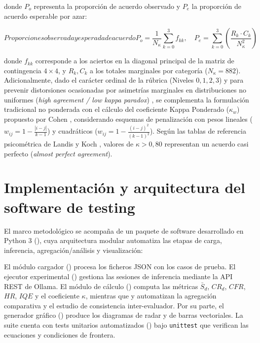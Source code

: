 donde $P_o$ representa la proporción de acuerdo observado y $P_e$ la proporción de acuerdo esperable por azar:

\begin{equation}[EQ:PROPORCIONESKAPPA]{Proporciones observada y esperada de acuerdo}
    P_o = \frac{1}{N_\kappa} \sum_{k=0}^{3} f_{kk}, \quad P_e = \sum_{k=0}^{3} \left( \frac{R_k \cdot C_k}{N_\kappa^2} \right)
\end{equation}

donde $f_{kk}$ corresponde a los aciertos en la diagonal principal de la matriz de contingencia $4 \times 4$, y $R_k, C_k$ a los totales marginales por categoría ($N_\kappa = 882$). Adicionalmente, dado el carácter ordinal de la rúbrica (Niveles $0, 1, 2, 3$) y para prevenir distorsiones ocasionadas por asimetrías marginales en distribuciones no uniformes (\textit{high agreement / low kappa paradox}) \cite{feinstein1990high}, se complementa la formulación tradicional no ponderada con el cálculo del coeficiente Kappa Ponderado ($\kappa_w$) propuesto por Cohen \cite{cohen1968weighted}, considerando esquemas de penalización con pesos lineales ($w_{ij} = 1 - \frac{|i-j|}{k-1}$) y cuadráticos ($w_{ij} = 1 - \frac{(i-j)^2}{(k-1)^2}$). Según las tablas de referencia psicométrica de Landis y Koch \cite{landis1977measurement}, valores de $\kappa > 0{,}80$ representan un acuerdo casi perfecto (\textit{almost perfect agreement}).

\section{Implementación y arquitectura del software de testing}
\label{sec:arquitectura_software}
El marco metodológico se acompaña de un paquete de software desarrollado en Python 3 (), cuya arquitectura modular automatiza las etapas de carga, inferencia, agregación/análisis y visualización:

El módulo cargador () procesa los ficheros JSON con los casos de prueba. El ejecutor experimental () gestiona las sesiones de inferencia mediante la API REST de Ollama. El módulo de cálculo () computa las métricas $\bar{S}_d$, $CR_d$, $CFR$, $HR$, $IQE$ y el coeficiente $\kappa$, mientras que  y  automatizan la agregación comparativa y el estudio de consistencia inter-evaluador. Por su parte, el generador gráfico () produce los diagramas de radar y de barras vectoriales. La suite cuenta con tests unitarios automatizados () bajo \texttt{unittest} que verifican las ecuaciones y condiciones de frontera.

